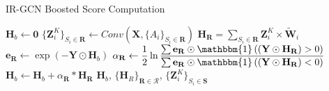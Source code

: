 \begin{algorithm}
\caption{IR-GCN Boosted Score Computation}\label{alg:inference}
\begin{algorithmic}[1]
  \State $\mathbf{H}_{b} \gets \mathbf{0} $
    \State $\{ \mathbf{Z}_i^K \}_{S_i \in \mathbf{R}} \gets Conv(\mathbf{X}, \{ A_i \}_{S_i \in \mathbf{R}})$
    \State {}
    \State $\mathbf{H}_\mathbf{R} =\sum_{{S_i} \in \mathbf{R}} \mathbf{Z}_i^{K} \times \widetilde{\mathbf{W}}_i$ 
    \State $ \mathbf{e}_{\mathbf{R}} \gets \exp({-\mathbf{Y} \odot \mathbf{H}_{b}})$
    \State {}
  \State $\alpha_\mathbf{R} \gets \dfrac{1}{2} \ln{\dfrac{\sum \mathbf{e}_{\mathbf{R}} \odot \mathbbm{1}\left((\mathbf{Y} \odot \mathbf{H}_{\mathbf{R}}\right) > 0)}{\sum \mathbf{e}_{\mathbf{R}} \odot \mathbbm{1}\left((\mathbf{Y} \odot \mathbf{H}_{\mathbf{R}}) < 0 \right) }}$
    \State {}
      \State {}
  \State    $\mathbf{H}_{b} \gets \mathbf{H}_{b} + \alpha_\mathbf{R} * \mathbf{H}_{\mathbf{R}}$ 
    \EndFor
    \State \Return $\mathbf{H}_{b}$, $ \{ \mathbf{H}_{R} \}_{\mathbf{R} \in \mathcal{R}}$, $\{ \mathbf{Z}_{i}^{K} \}_{S_i \in \mathbf{S}}$
    \State {}
    \State {}
\EndFunction
\end{algorithmic}
\end{algorithm}


